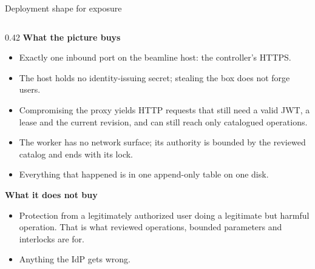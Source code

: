 \begin{frame}{Deployment shape for exposure}
\begin{columns}[T]
        \begin{column}{0.42\textwidth}
            \footnotesize
            \textbf{What the picture buys}
            \begin{itemize}
                \item Exactly one inbound port on the beamline host: the controller's HTTPS.
                \item The host holds no identity-issuing secret; stealing the box does not forge users.
                \item Compromising the proxy yields HTTP requests that still need a valid JWT, a lease and the
                      current revision, and can still reach only catalogued operations.
                \item The worker has no network surface; its authority is bounded by the reviewed catalog
                      and ends with its lock.
                \item Everything that happened is in one append-only table on one disk.
            \end{itemize}
            \vspace{0.05cm}
            \textbf{What it does not buy}
            \begin{itemize}
                \item Protection from a legitimately authorized user doing a legitimate but harmful operation.
                      That is what reviewed operations, bounded parameters and interlocks are for.
                \item Anything the IdP gets wrong.
            \end{itemize}
        \end{column}
    \end{columns}
\end{frame}
